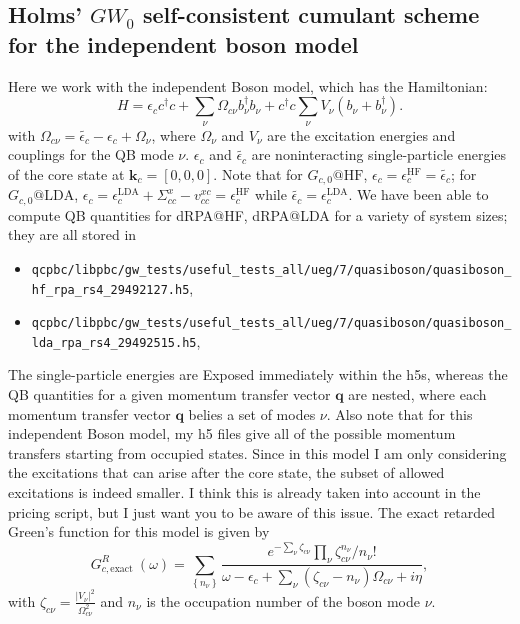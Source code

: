 \subsection{Holms' \(GW_0\) self-consistent cumulant scheme for the independent boson model}
Here we work with the independent Boson model, which has the Hamiltonian:
\begin{equation}
H=\epsilon_c c^{\dagger} c+\sum_\nu \Omega_{c\nu} b_\nu^{\dagger} b_\nu+c^{\dagger} c \sum_\nu V_\nu\left(b_\nu+b_\nu^{\dagger}\right) .
\end{equation}
with $\Omega_{c\nu}= \tilde{\epsilon_c}-\epsilon_c+\Omega_\nu$, where $\Omega_\nu$ and $V_\nu$ are the excitation energies and couplings for the QB mode $\nu$. $\epsilon_c$ and $\tilde{\epsilon_c}$ are noninteracting single-particle energies of the core state at $\mathbf{k}_c=[0,0,0]$.  Note that for $G_{c,0}@\mathrm{HF}$, $\epsilon_c=\epsilon_c^{\mathrm{HF}}=\tilde{\epsilon_c}$; for $G_{c,0}@\mathrm{LDA}$, $\epsilon_c=\epsilon_c^{\mathrm{LDA}}+\Sigma_{cc}^{x}-v_{cc}^{xc}
=\epsilon_c^{\mathrm{HF}}$ while $\tilde{\epsilon_c}=\epsilon_c^{\mathrm{LDA}}$. We have been able to compute QB quantities for dRPA@HF, dRPA@LDA for a variety of system sizes; they are all stored in
\begin{itemize}
    \item \texttt{qcpbc/libpbc/gw\_tests/useful\_tests\_all/ueg/7/quasiboson/quasiboson\_hf\_rpa\_rs4\_29492127.h5},
    \item \texttt{qcpbc/libpbc/gw\_tests/useful\_tests\_all/ueg/7/quasiboson/quasiboson\_lda\_rpa\_rs4\_29492515.h5},
\end{itemize}
The single-particle energies are Exposed immediately within the h5s, whereas the QB quantities for a given momentum transfer vector $\mathbf{q}$ are nested, where each momentum transfer vector $\bm{q}$ belies a set of modes $\nu$. Also note that for this independent Boson model, my h5 files give all of the possible momentum transfers starting from occupied states. Since in this model I am only considering the excitations that can arise after the core state, the subset of allowed excitations is indeed smaller. I think this is already taken into account in the pricing script, but I just want you to be aware of this issue.  The exact retarded Green's function for this model is given by
\begin{equation}
    G^R_{c,\text {exact }}(\omega)=\sum_{\left\{n_\nu\right\}} \frac{e^{-\sum_\nu \zeta_{c\nu}} \prod_\nu \zeta_{c\nu}^{n_\nu} / n_{\nu}!}{\omega-\epsilon_c+\sum_\nu (\zeta_{c\nu}-n_\nu )\Omega_{c\nu}+i \eta}, 
\label{eq:exact_g}
\end{equation}
with  $\zeta_{c\nu} = \frac{|V_\nu|^2}{\Omega_{c\nu}^2}$ and $n_\nu$ is the occupation number of the boson mode $\nu$. 
